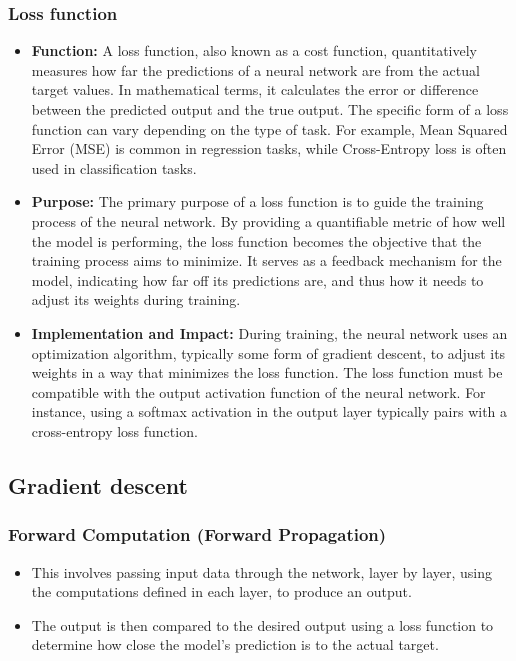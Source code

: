 \documentclass{article}
\begin{document}
\subsubsection{Loss function}
\begin{itemize}
    \item \textbf{Function:} A loss function, also known as a cost function, quantitatively measures how far the predictions of a neural network are from the actual target values. In mathematical terms, it calculates the error or difference between the predicted output and the true output. The specific form of a loss function can vary depending on the type of task. For example, Mean Squared Error (MSE) is common in regression tasks, while Cross-Entropy loss is often used in classification tasks.
    \item \textbf{Purpose:} The primary purpose of a loss function is to guide the training process of the neural network. By providing a quantifiable metric of how well the model is performing, the loss function becomes the objective that the training process aims to minimize. It serves as a feedback mechanism for the model, indicating how far off its predictions are, and thus how it needs to adjust its weights during training.
    \item \textbf{Implementation and Impact:} During training, the neural network uses an optimization algorithm, typically some form of gradient descent, to adjust its weights in a way that minimizes the loss function. The loss function must be compatible with the output activation function of the neural network. For instance, using a softmax activation in the output layer typically pairs with a cross-entropy loss function.
\end{itemize}

\subsection{Gradient descent}

\subsubsection{Forward Computation (Forward Propagation)}

\begin{itemize}
    \item This involves passing input data through the network, layer by layer, using the computations defined in each layer, to produce an output.
    \item The output is then compared to the desired output using a loss function to determine how close the model's prediction is to the actual target.
\end{itemize}
\end{document}
